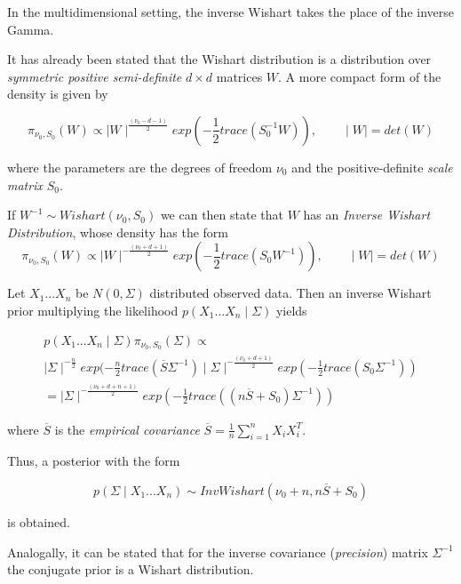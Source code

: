 \documentclass[12pt,openright,twoside,a4paper]{book}
\begin{document}
In the multidimensional setting, the inverse Wishart takes the place of the inverse Gamma.

It has already been stated that the Wishart distribution is a distribution over \textit{symmetric positive semi-definite} $d\times d$ matrices $W$. A more compact form of the density is given by

\begin{equation}
\pi_{\nu_0, S_0}(W)\propto \mid W\mid ^{\frac{(\nu_0-d-1)}{2}}exp(-\frac{1}{2}trace(S_0^{-1}W)), \qquad \mid W\mid=det(W)
\end{equation}

where the parameters are the degrees of freedom $\nu_0$ and the positive-definite \textit{scale matrix}
$S_0$.

If $W^{-1}\sim Wishart(\nu_0, S_0)$ we can then state that $W$ has an \textit{Inverse Wishart Distribution}, whose density has the form
\begin{equation}
\pi_{\nu_0, S_0}(W)\propto \mid W\mid ^{-\frac{(\nu_0+d+1)}{2}}exp(-\frac{1}{2}trace(S_0W^{-1})), \qquad \mid W\mid=det(W)
\end{equation}

Let $X_1...X_n$ be $N(0,\Sigma)$ distributed observed data. Then an inverse Wishart prior multiplying the likelihood $p(X_1...X_n\mid \Sigma)$ yields

\begin{equation}
\begin{aligned}
p(X_1...X_n\mid \Sigma)\pi_{\nu_0, S_0}(\Sigma)\propto \\[10pt]
 \mid\Sigma \mid ^{-\frac{n}{2}}exp(-\frac{n}{2}trace(\overline{S} \Sigma^{-1}) \mid \Sigma\mid ^{-\frac{(\nu_0+d+1)}{2}}exp(-\frac{1}{2}trace(S_0\Sigma^{-1})) \\[10pt]  
=  \mid \Sigma\mid ^{-\frac{(\nu_0+d+n+1)}{2}}exp(-\frac{1}{2}trace((n\overline{S}+S_0)\Sigma^{-1}))
\end{aligned}
\end{equation}

where $\overline{S}$ is the \textit{empirical covariance} $\overline{S}=\frac{1}{n}\sum_{i=1}
^nX_iX_i^T$.

Thus, a posterior with the form

\begin{equation}
p(\Sigma\mid X_1...X_n)\sim InvWishart(\nu_0+n, n\overline{S}+S_0)
\end{equation}

is obtained.

Analogally, it can be stated that for the inverse covariance (\textit{precision}) matrix $\Sigma^{-1}$ the conjugate prior is a Wishart distribution.
\end{document}
